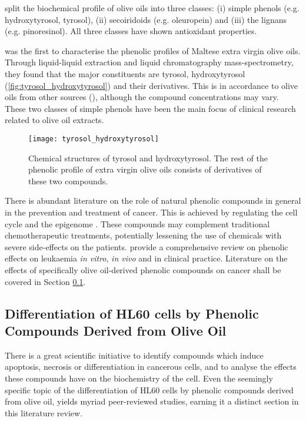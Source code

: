 \cite{owen2000} split the biochemical profile of olive oils into three classes: (i) simple phenols (e.g. hydroxytyrosol, tyrosol), (ii) secoiridoids (e.g. oleuropein) and (iii) the lignans (e.g. pinoresinol). All three classes have shown antioxidant properties.

\cite{gatt2021first} was the first to characterise the phenolic profiles of Maltese extra virgin olive oils. Through liquid-liquid extraction and liquid chromatography mass-spectrometry, they found that the major constituents are tyrosol, hydroxytyrosol (\autoref{fig:tyrosol_hydroxytyrosol}) and their derivatives. This is in accordance to olive oils from other sources (\citep{Angerosa1995}), although the compound concentrations may vary. These two classes of simple phenols have been the main focus of clinical research related to olive oil extracts.

\begin{figure}[!h]
    \centering
    \texttt{[image: tyrosol\_hydroxytyrosol]}
    \caption[Chemical structures of tyrosol and hydroxytyrosol]{Chemical structures of tyrosol and hydroxytyrosol. The rest of the phenolic profile of extra virgin olive oils consists of derivatives of these two compounds.} 
    \label{fig:tyrosol_hydroxytyrosol}
\end{figure}


There is abundant literature on the role of natural phenolic compounds in general in the prevention and treatment of cancer. This is achieved by regulating the cell cycle \citep{jafari2014role} and the epigenome \citep{pan2015breast}. These compounds may complement traditional chemotherapeutic treatments, potentially lessening the use of chemicals with severe side-effects on the patients. \cite{gatt2021phenolic} provide a comprehensive review on phenolic effects on leukaemia \textit{in vitro}, \textit{in vivo} and in clinical practice. Literature on the effects of specifically olive oil-derived phenolic compounds on cancer shall be covered in Section \ref{Differentiation_AML}.

\subsection{Differentiation of HL60 cells by Phenolic Compounds Derived from Olive Oil}
\label{Differentiation_AML}
There is a great scientific initiative to identify compounds which induce apoptosis, necrosis or differentiation in cancerous cells, and to analyse the effects these compounds have on the biochemistry of the cell. Even the seemingly specific topic of the differentiation of HL60 cells by phenolic compounds derived from olive oil, yields myriad peer-reviewed studies, earning it a distinct section in this literature review.

